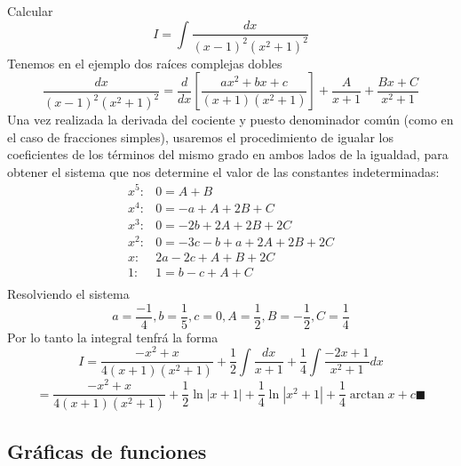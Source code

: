 \documentclass[10pt,twoside]{SelfArx} %
\begin{document}
\begin{ejemplo}
	Calcular
	\begin{equation}
	I=\displaystyle\int\dfrac{dx}{(x-1)^{2}(x^{2}+1)^{2}}
	\end{equation}
	Tenemos en el ejemplo dos raíces complejas dobles
	\begin{equation}
	\dfrac{dx}{(x-1)^{2}(x^{2}+1)^{2}}=\dfrac{d}{dx}\left [\dfrac{ax^{2}+bx+c}{(x+1)(x^{2}+1)}\right ]+\dfrac{A}{x+1}+\dfrac{Bx+C}{x^{2}+1}
	\end{equation}
	Una vez realizada la derivada del cociente y puesto denominador común
	(como en el caso de fracciones simples), usaremos el procedimiento de
	igualar los coeficientes de los términos del mismo grado en ambos lados de
	la igualdad, para obtener el sistema que nos determine el valor de las
	constantes indeterminadas:
	\[ 
	\begin{array}{cc}
	x^{5}:& 0=A+B\\
	x^{4}:& 0=-a+A+2B+C\\
	x^{3}:& 0=-2b+2A+2B+2C\\
	x^{2}:& 0=-3c-b+a+2A+2B+2C\\
	x: & 2a-2c+A+B+2C\\
	1:& 1=b-c+A+C\\
	\end{array}
	 \]
	 Resolviendo el sistema
	 \[ a=\dfrac{-1}{4}, b=\dfrac{1}{5}, c=0, A=\dfrac{1}{2}, B=-\dfrac{1}{2}, C=\dfrac{1}{4} \]
	 Por lo tanto la integral tenfrá la forma
	 \begin{equation}
	 I=\displaystyle\dfrac{-x^{2}+x}{4(x+1)(x^{2}+1)}+\dfrac{1}{2}\int\dfrac{dx}{x+1}+\dfrac{1}{4}\int\dfrac{-2x+1}{x^{2}+1}dx
	 \end{equation}
	 \begin{equation}
	 =\displaystyle\dfrac{-x^{2}+x}{4(x+1)(x^{2}+1)}+\dfrac{1}{2}\ln|x+1|+\dfrac{1}{4}\ln |x^{2}+1|+\dfrac{1}{4}\arctan x+c\blacksquare
	 \end{equation}
\end{ejemplo}









\subsection{Gráficas de funciones}
\end{document}
